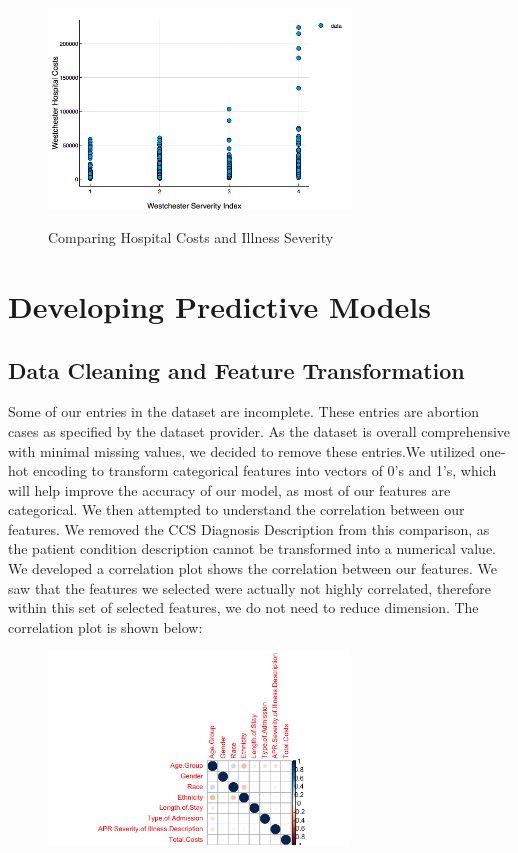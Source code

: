 \documentclass{article}
\begin{document}
\begin{figure}[h]
\centering
  \includegraphics[width=8cm]{newplot.png}
  \label{fig:boat1}
  \caption{Comparing Hospital Costs and Illness Severity}
\end{figure}

\section{Developing Predictive Models}

\subsection{Data Cleaning and Feature Transformation}
Some of our entries in the dataset are incomplete. These entries are abortion cases as specified by the dataset provider. As the dataset is overall comprehensive with minimal missing values, we decided to remove these entries.We utilized one-hot encoding to transform categorical features into vectors of 0's and 1's, which will help improve the accuracy of our model, as most of our features are categorical.\newline \newline
We then attempted to understand the correlation between our features. We removed the CCS Diagnosis Description from this comparison, as the patient condition description cannot be transformed into a numerical value. We developed a correlation plot shows the correlation between our features. We saw that the features we selected were actually not highly correlated, therefore within this set of selected features, we do not need to reduce dimension. The correlation plot is shown below:

\begin{figure}[h]
\centering
  \includegraphics[width=8cm]{Rplot.png}
  \label{fig:boat1}
\end{figure}
\end{document}
